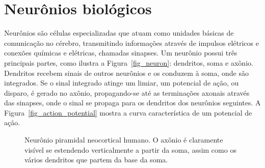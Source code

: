 \section{Neurônios biológicos}\label{sec_neurônios}

Neurônios são células especializadas que atuam como unidades básicas de comunicação no cérebro, transmitindo informações através
de impulsos elétricos e conexões químicas e elétricas, chamadas sinapses. Um neurônio possui três principais partes, como ilustra
a Figura~\ref{fig_neuron}: dendritos, soma e axônio. Dendritos recebem sinais de outros neurônios e os conduzem à soma,
onde são integrados. Se o sinal integrado atinge um limiar, um potencial de ação, ou disparo, é gerado no axônio, propagando-se
até as terminações axonais através das sinapses, onde o sinal se propaga para os dendritos dos neurônios seguintes. A
Figura~\ref{fig_action_potential} mostra a curva característica de um potencial de ação.

\begin{figure}[!ht]
\caption{Neurônio piramidal neocortical humano. O axônio é claramente visível se estendendo verticalmente a partir da soma, assim
como os vários dendritos que partem da base da soma.}
\end{figure}

